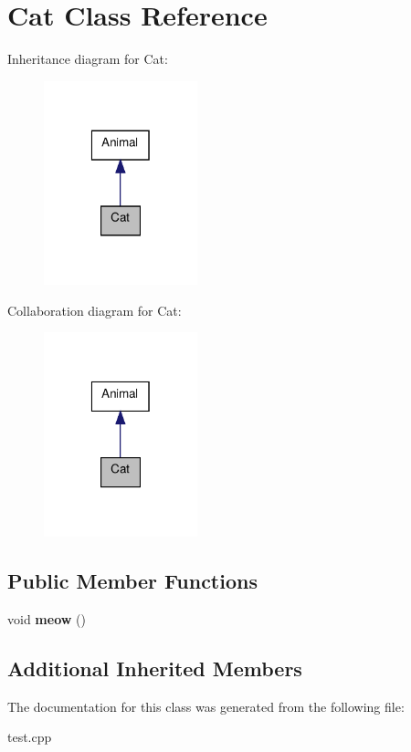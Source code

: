 \hypertarget{classCat}{\section{Cat Class Reference}
\label{classCat}
}


Inheritance diagram for Cat\+:\nopagebreak
\begin{figure}[H]
\begin{center}
\leavevmode
\includegraphics[width=126pt]{classCat__inherit__graph}
\end{center}
\end{figure}


Collaboration diagram for Cat\+:\nopagebreak
\begin{figure}[H]
\begin{center}
\leavevmode
\includegraphics[width=126pt]{classCat__coll__graph}
\end{center}
\end{figure}
\subsection*{Public Member Functions}
\begin{DoxyCompactItemize}
\item 
\hypertarget{classCat_aa770c672b7458b036d7384a6915d9367}{void {\bfseries meow} ()}\label{classCat_aa770c672b7458b036d7384a6915d9367}

\end{DoxyCompactItemize}
\subsection*{Additional Inherited Members}


The documentation for this class was generated from the following file\+:\begin{DoxyCompactItemize}
\item 
test.\+cpp\end{DoxyCompactItemize}
